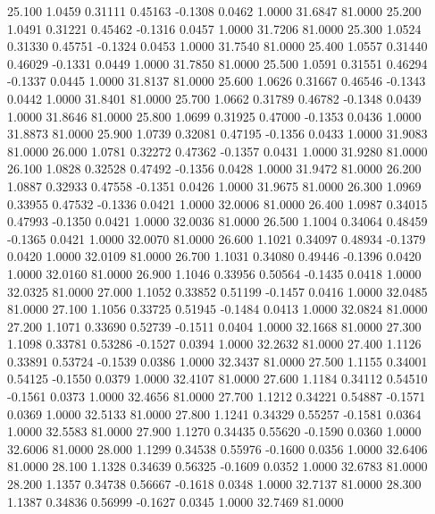   25.100   1.0459   0.31111   0.45163  -0.1308   0.0462   1.0000  31.6847  81.0000
  25.200   1.0491   0.31221   0.45462  -0.1316   0.0457   1.0000  31.7206  81.0000
  25.300   1.0524   0.31330   0.45751  -0.1324   0.0453   1.0000  31.7540  81.0000
  25.400   1.0557   0.31440   0.46029  -0.1331   0.0449   1.0000  31.7850  81.0000
  25.500   1.0591   0.31551   0.46294  -0.1337   0.0445   1.0000  31.8137  81.0000
  25.600   1.0626   0.31667   0.46546  -0.1343   0.0442   1.0000  31.8401  81.0000
  25.700   1.0662   0.31789   0.46782  -0.1348   0.0439   1.0000  31.8646  81.0000
  25.800   1.0699   0.31925   0.47000  -0.1353   0.0436   1.0000  31.8873  81.0000
  25.900   1.0739   0.32081   0.47195  -0.1356   0.0433   1.0000  31.9083  81.0000
  26.000   1.0781   0.32272   0.47362  -0.1357   0.0431   1.0000  31.9280  81.0000
  26.100   1.0828   0.32528   0.47492  -0.1356   0.0428   1.0000  31.9472  81.0000
  26.200   1.0887   0.32933   0.47558  -0.1351   0.0426   1.0000  31.9675  81.0000
  26.300   1.0969   0.33955   0.47532  -0.1336   0.0421   1.0000  32.0006  81.0000
  26.400   1.0987   0.34015   0.47993  -0.1350   0.0421   1.0000  32.0036  81.0000
  26.500   1.1004   0.34064   0.48459  -0.1365   0.0421   1.0000  32.0070  81.0000
  26.600   1.1021   0.34097   0.48934  -0.1379   0.0420   1.0000  32.0109  81.0000
  26.700   1.1031   0.34080   0.49446  -0.1396   0.0420   1.0000  32.0160  81.0000
  26.900   1.1046   0.33956   0.50564  -0.1435   0.0418   1.0000  32.0325  81.0000
  27.000   1.1052   0.33852   0.51199  -0.1457   0.0416   1.0000  32.0485  81.0000
  27.100   1.1056   0.33725   0.51945  -0.1484   0.0413   1.0000  32.0824  81.0000
  27.200   1.1071   0.33690   0.52739  -0.1511   0.0404   1.0000  32.1668  81.0000
  27.300   1.1098   0.33781   0.53286  -0.1527   0.0394   1.0000  32.2632  81.0000
  27.400   1.1126   0.33891   0.53724  -0.1539   0.0386   1.0000  32.3437  81.0000
  27.500   1.1155   0.34001   0.54125  -0.1550   0.0379   1.0000  32.4107  81.0000
  27.600   1.1184   0.34112   0.54510  -0.1561   0.0373   1.0000  32.4656  81.0000
  27.700   1.1212   0.34221   0.54887  -0.1571   0.0369   1.0000  32.5133  81.0000
  27.800   1.1241   0.34329   0.55257  -0.1581   0.0364   1.0000  32.5583  81.0000
  27.900   1.1270   0.34435   0.55620  -0.1590   0.0360   1.0000  32.6006  81.0000
  28.000   1.1299   0.34538   0.55976  -0.1600   0.0356   1.0000  32.6406  81.0000
  28.100   1.1328   0.34639   0.56325  -0.1609   0.0352   1.0000  32.6783  81.0000
  28.200   1.1357   0.34738   0.56667  -0.1618   0.0348   1.0000  32.7137  81.0000
  28.300   1.1387   0.34836   0.56999  -0.1627   0.0345   1.0000  32.7469  81.0000
